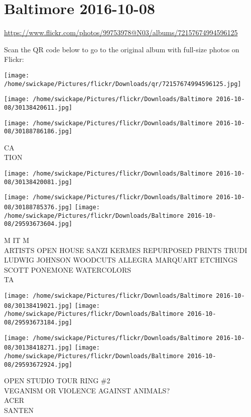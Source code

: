 \documentclass[10pt,letterpaper]{article}
\title{}
\author{}
\date{}
\begin{document}
\section*{Baltimore 2016-10-08}

\url{https://www.flickr.com/photos/99753978@N03/albums/72157674994596125}

Scan the QR code below to go to the original album with full-size photos on Flickr:

\texttt{[image: /home/swickape/Pictures/flickr/Downloads/qr/72157674994596125.jpg]}
\pagebreak

\texttt{[image: /home/swickape/Pictures/flickr/Downloads/Baltimore 2016-10-08/30138420611.jpg]}

\vspace{0.25in}
\texttt{[image: /home/swickape/Pictures/flickr/Downloads/Baltimore 2016-10-08/30188786186.jpg]}

CA\\
TION
\pagebreak

\texttt{[image: /home/swickape/Pictures/flickr/Downloads/Baltimore 2016-10-08/30138420081.jpg]}

\vspace{0.25in}
\texttt{[image: /home/swickape/Pictures/flickr/Downloads/Baltimore 2016-10-08/30188785376.jpg]}
\texttt{[image: /home/swickape/Pictures/flickr/Downloads/Baltimore 2016-10-08/29593673604.jpg]}

M IT M\\
ARTISTS OPEN HOUSE SANZI KERMES REPURPOSED PRINTS TRUDI LUDWIG JOHNSON WOODCUTS ALLEGRA MARQUART ETCHINGS SCOTT PONEMONE WATERCOLORS\\
TA
\pagebreak

\texttt{[image: /home/swickape/Pictures/flickr/Downloads/Baltimore 2016-10-08/30138419021.jpg]}
\texttt{[image: /home/swickape/Pictures/flickr/Downloads/Baltimore 2016-10-08/29593673184.jpg]}

\texttt{[image: /home/swickape/Pictures/flickr/Downloads/Baltimore 2016-10-08/30138418271.jpg]}
\texttt{[image: /home/swickape/Pictures/flickr/Downloads/Baltimore 2016-10-08/29593672924.jpg]}

OPEN STUDIO TOUR RING \#2\\
VEGANISM OR VIOLENCE AGAINST ANIMALS?\\
ACER\\
SANTEN
\pagebreak
\end{document}
